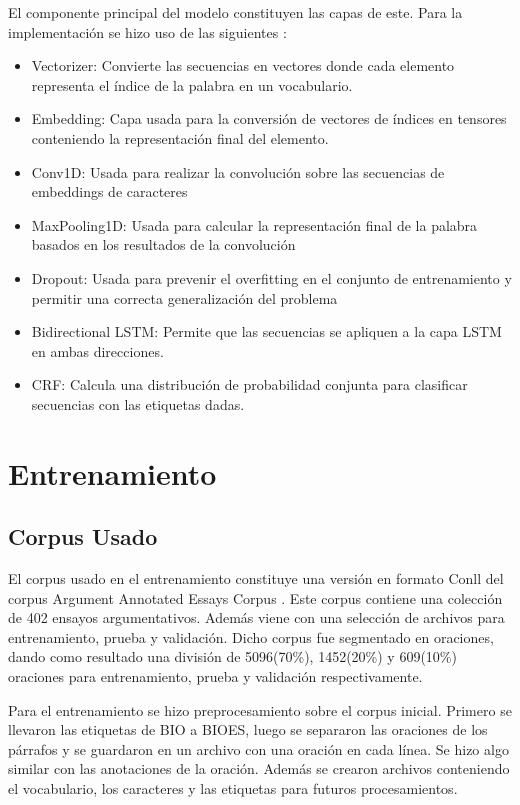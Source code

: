 \documentclass[runningheads]{llncs}
\begin{document}
El componente principal del modelo constituyen las capas de este. Para la implementación
se hizo uso de las siguientes \cite{tensorflowDoc} \cite{kerasDoc}:

\begin{itemize}
	\item Vectorizer: Convierte las secuencias en vectores donde cada elemento representa el
	índice de la palabra en un vocabulario.
	\item Embedding: Capa usada para la conversión de vectores de índices en tensores conteniendo
	la representación final del elemento.
	\item Conv1D: Usada para realizar la convolución sobre las secuencias de embeddings de
	caracteres
	\item MaxPooling1D: Usada para calcular la representación final de la palabra basados 
	en los resultados de la convolución
	\item Dropout: Usada para prevenir el overfitting en el conjunto de entrenamiento y
	permitir una correcta generalización del problema
	\item Bidirectional LSTM: Permite que las secuencias se apliquen a la capa LSTM en ambas
	direcciones.
	\item CRF: Calcula una distribución de probabilidad conjunta para clasificar secuencias
	con las etiquetas dadas.
\end{itemize}

\section{Entrenamiento}

\subsection{Corpus Usado}

El corpus usado en el entrenamiento constituye una versión en formato
Conll del corpus Argument Annotated Essays Corpus \cite{corpus}. Este corpus contiene una 
colección de 402 ensayos argumentativos. Además viene con una selección de archivos
para entrenamiento, prueba y validación. Dicho corpus fue segmentado
en oraciones, dando como resultado una división de 5096(70\%), 1452(20\%) y 609(10\%) oraciones para
entrenamiento, prueba y validación respectivamente. 

Para el entrenamiento se hizo preprocesamiento sobre el corpus inicial. Primero se llevaron
las etiquetas de BIO a BIOES, luego se separaron las oraciones de los párrafos y se guardaron
en un archivo con una oración en cada línea. Se hizo algo similar con las anotaciones de la oración.
Además se crearon archivos conteniendo el vocabulario, los caracteres y las etiquetas para futuros
procesamientos.
\end{document}

